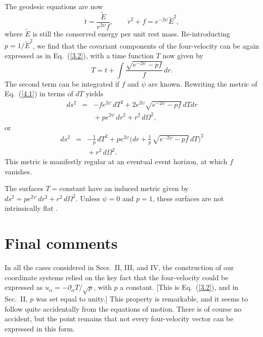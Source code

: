 The geodesic equations are now
\begin{equation} 
\dot{t}= \frac{\tilde{E}}{e^{2\psi} f}, \qquad
\dot{r}^2 + f = e^{-2\psi} \tilde{E}^2, 
\label{4.2}
\end{equation}
where $\tilde{E}$ is still the conserved energy per unit rest
mass. Re-introducting $p = 1/\tilde{E}^2$, we find that the covariant 
components of the four-velocity can be again expressed as in
Eq.~(\ref{3.2}), with a time function $T$ now given by 
\begin{equation}
T = t + \int \frac{\sqrt{e^{-2\psi} - p f}}{f}\, dr. 
\label{4.3}
\end{equation}
The second term can be integrated if $f$ and $\psi$ are
known. Rewriting the metric of Eq.~(\ref{4.1}) in terms of $dT$ yields  
\begin{eqnarray}
ds^2 &=& -f e^{2\psi}\, dT^2 
+ 2 e^{2\psi} \sqrt{e^{-2\psi} - p f}\, dT dr
\nonumber \\ & & \mbox{}
 + p e^{2\psi}\, dr^2 + r^2\, d\Omega^2, 
\label{4.4}
\end{eqnarray}
or
\begin{eqnarray}
ds^2 &=& -\frac{1}{p}\, dT^2 + p e^{2\psi} \biggl( dr 
+ \frac{1}{p}\, \sqrt{e^{-2\psi} - p f}\, dT \biggr)^2 
\nonumber \\ & & \mbox{} 
+ r^2\, d\Omega^2. 
\label{4.5}
\end{eqnarray}
This metric is manifestly regular at an eventual event horizon, at
which $f$ vanishes.   

The surfaces $T = \mbox{constant}$ have an induced metric given by
$ds^2 = p e^{2\psi}\, dr^2 + r^2\, d\Omega^2$. Unless $\psi = 0$ and  
$p = 1$, these surfaces are not intrinsically flat \cite{f3}.  

\section{Final comments} 

In all the cases considered in Secs.~II, III, and IV, the construction
of our coordinate systems relied on the key fact that the 
four-velocity could be expressed as $u_\alpha =
-\partial_\alpha T/\sqrt{p}$, with $p$ a constant. [This is
Eq.~(\ref{3.2}), and in Sec.~II, $p$ was set equal to unity.] This
property is remarkable, and it seems to follow quite accidentally from
the equations of motion. There is of course no accident, but the point
remains that not every four-velocity vector can be expressed in this
form.  

